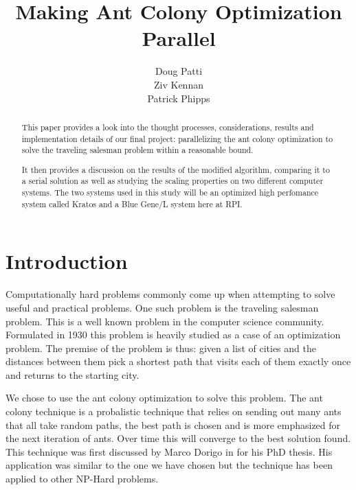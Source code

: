 \documentclass{acm_proc_article-sp}
\begin{document}
\title{Making Ant Colony Optimization Parallel}


\author{
\alignauthor
Doug Patti\\
\alignauthor
Ziv Kennan\\
\alignauthor Patrick Phipps\\
}

\maketitle
\begin{abstract}

This paper provides a look into the thought processes, considerations, results and
implementation details of our final project: parallelizing the ant colony 
optimization to solve the traveling salesman problem within a reasonable bound. 

It then provides a discussion on the results of the modified algorithm,
comparing it to a serial solution as well as studying the scaling properties
on two different computer systems. The two systems used in this study will be
an optimized high perfomance system called Kratos and a Blue Gene/L system here
at RPI.

\end{abstract}



\section{Introduction}
Computationally hard problems commonly come up when attempting to solve
useful and practical problems. One such problem is the traveling salesman 
problem. This is a well known problem in the computer science community. Formulated
in 1930 \citep{graphtheory} this problem is heavily studied as a case of an optimization problem.
The premise of the problem is thus: given a list of cities and the distances
between them pick a shortest path that visits each of them exactly once and
returns to the starting city. 

We chose to use the ant colony optimization to solve this problem. The ant colony
technique is a probalistic technique that relies on sending out many ants that
all take random paths, the best path is chosen and is more emphasized for
the next iteration of ants. Over time this will converge to the best
solution found. This technique was first discussed by Marco Dorigo in \citep{optimization} for his
PhD thesis. His application was similar to the one we have chosen but the technique
has been applied to other NP-Hard problems.
\end{document}
